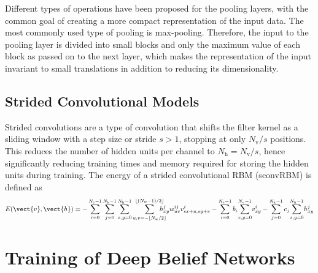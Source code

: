 Different types of operations \citep{scherer2010} have been
proposed for the pooling layers, with the common goal of creating a more compact
representation of the input data. The most commonly used type of pooling is
max-pooling. Therefore, the input to the pooling layer is divided into small
blocks and only the maximum value of each block as passed on to the next layer,
which makes the representation of the input invariant to small
translations in addition to reducing its dimensionality.

\subsection{Strided Convolutional Models}


Strided convolutions are a type of convolution that shifts the filter kernel as
a sliding window with a step size or stride $s > 1$, stopping at only $N_\text{v}
/ s$ positions. This reduces the number of hidden units per channel to
$N_\text{h} = N_\text{v} / s$, hence significantly reducing training times and
memory required for storing the hidden units during training. The energy of a
strided convolutional RBM (sconvRBM) is defined as
\begin{equation} 
E(\vect{v},\vect{h}) = 
-\sum_{i=0}^{N_\text{c}-1}\sum_{j=0}^{N_\text{k}-1}\sum_{x,y=0}^{N_\text{h}-1}
\sum_{u,v=-\lfloor N_\text{w}/2\rfloor}^{\lfloor(N_\text{w}-1)/2\rfloor}
\hspace{-1.2em}h_{xy}^jw_{uv}^{ij}v_{sx+u, sy + v}^i -
\sum_{i=0}^{N_\text{c}-1}b_i\!\sum_{x,y = 0}^{N_\text{v}-1}\!v_{xy}^i -
\sum_{j=0}^{N_\text{k}-1}c_j\!\sum_{x,y = 0}^{N_\text{h}-1}\!h_{xy}^j
\end{equation}  

\section{Training of Deep Belief Networks}

